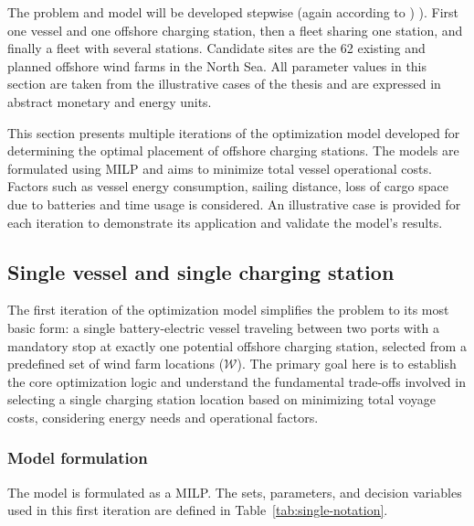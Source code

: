 The problem and model will be developed stepwise (again according to ) \citet{Agersborg2025}). First one vessel and one offshore charging station, then a fleet sharing one station, and finally a fleet with several stations. Candidate sites are the 62 existing and planned offshore wind farms in the North Sea. All parameter values in this section are taken from the illustrative cases of the thesis and are expressed in abstract monetary and energy units.


This section presents multiple iterations of the optimization model developed for determining the optimal placement of offshore charging stations. The models are formulated using MILP and aims to minimize total vessel operational costs. Factors such as vessel energy consumption, sailing distance, loss of cargo space due to batteries and time usage is considered. An illustrative case is provided for each iteration to demonstrate its application and validate the model's results.


\subsection{Single vessel and single charging station}
\label{sec:single-vessel-single-station}

The first iteration of the optimization model simplifies the problem to its most basic form: a single battery-electric vessel traveling between two ports with a mandatory stop at exactly one potential offshore charging station, selected from a predefined set of wind farm locations ($\mathcal{W}$). The primary goal here is to establish the core optimization logic and understand the fundamental trade-offs involved in selecting a single charging station location based on minimizing total voyage costs, considering energy needs and operational factors.

\subsubsection{Model formulation}
\label{sec:single-formulation}

The model is formulated as a MILP. The sets, parameters, and decision variables used in this first iteration are defined in Table~\ref{tab:single-notation}.

